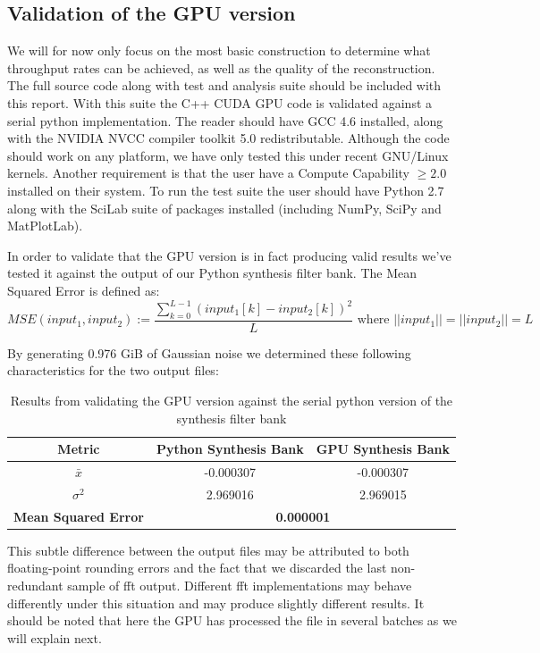 \documentclass[a4paper,10pt]{article}
\begin{document}
\subsection{Validation of the GPU version}
We will for now only focus on the most basic construction to determine what throughput rates can be achieved, as well as the quality of the reconstruction. The full source code
along with test and analysis suite should be included with this report. With this suite the C++ CUDA GPU code is validated against a serial python implementation. The reader 
should have GCC 4.6 installed, along with the NVIDIA NVCC compiler toolkit 5.0 redistributable. Although the code should work on any platform, we have only tested this under 
recent GNU/Linux kernels. Another requirement is that the user have a Compute Capability $\geq2.0$ installed on their system. To run the test suite the user should have 
Python 2.7 along with the SciLab suite of packages installed (including NumPy, SciPy and MatPlotLab).

In order to validate that the GPU version is in fact producing valid results we've tested it against the output of our Python synthesis filter bank. The Mean Squared Error 
is defined as:
\begin{equation}
 MSE(input_1,input_2) := \frac{\sum_{k=0}^{L-1}{(input_1[k] - input_2[k])^2}}{L} \text{ where } ||input_1|| = ||input_2|| = L
\end{equation}

By generating 0.976 GiB of Gaussian noise we determined these following characteristics for the two output files:
\begin{table}
  \centering
  \begin{tabular}{|c|c|c|}
    \hline
    \textbf{Metric} & \textbf{Python Synthesis Bank} & \textbf{GPU Synthesis Bank} \\
    \hline
    $\bar x$ & -0.000307 & -0.000307 \\
    \hline
    $\sigma^{2}$ & 2.969016 & 2.969015 \\
    \hline
    \textbf{Mean Squared Error} & \multicolumn{2}{|c|}{\textbf{0.000001}} \\
    \hline
  \end{tabular}
  \caption{Results from validating the GPU version against the serial python version of the synthesis filter bank}
\end{table}

This subtle difference between the output files may be attributed to both floating-point rounding errors and the fact that we discarded the last non-redundant
sample of \gls{fft} output. Different \gls{fft} implementations may behave differently under this situation and may produce slightly different results. It should be noted
that here the GPU has processed the file in several batches as we will explain next.
\end{document}
